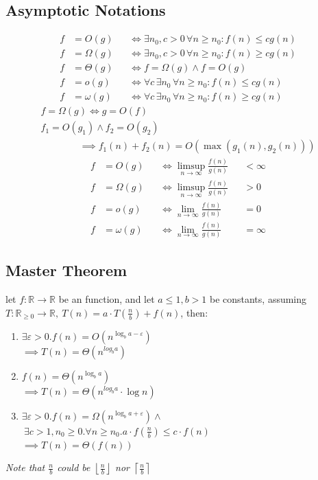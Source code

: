 \documentclass[]{article}
\newcommand\compactsubsection[1]        {\vspace{-10pt}\subsection{#1}\vspace{-5pt}}
\theoremstyle{definition}
\newcommand\R     {\mathbb{R}}
\newcommand\vepsi {\varepsilon}
\newcommand\rc    {\right\rceil}
\newcommand\lc    {\left\lceil}
\newcommand\rf    {\right\rfloor}
\newcommand\lf    {\left\lfloor}
\renewcommand\inf {\infty}
\newcommand\co        {\colon}
\newcommand\logn      {\log n}
\newcommand\dequad    {\!\!\!\!\!\!}
\begin{document}
\begin{multicols}{4}
			\vspace{-1pt}
			\compactsubsection{Asymptotic Notations}
				\vspace{6pt}
				\begin{alignat*}{9}
					f &= O(g) &&\iff \exists n_0, c > 0\, \forall n \ge n_0\co f(n) \le c g(n) \\
					f &= \Omega(g) &&\iff \exists n_0, c > 0\, \forall n \ge n_0\co f(n) \ge c g(n) \\
					f &= \Theta(g) &&\iff f = \Omega(g) \land f = O(g) \\
					f &= o(g) &&\iff \forall c\, \exists n_0\, \forall n \ge n_0\co f(n) \le cg(n) \\
					f &= \omega(g) &&\iff \forall c\, \exists n_0\, \forall n \ge n_0\co f(n) \ge cg(n)
				\end{alignat*}
				\vspace{-3pt}
				\begin{gather*}
					f = \Omega(g) \iff g = O(f) \\
					\dequad f_1 = O(g_1) \land f_2 = O(g_2)\quad\quad\quad\quad  \\ \quad\quad\quad\quad  \implies f_1(n) + f_2(n) = O(\max(g_1(n), g_2(n)))
				\end{gather*}
				\vspace{-5pt}
				\begin{alignat*}{9}
					f &= O(g)      &&\iff \limsup_{n \to \inf} \textstyle \frac{f(n)}{g(n)} &&< \inf \\
					f &= \Omega(g) &&\iff \limsup_{n \to \inf} \textstyle \frac{f(n)}{g(n)} &&> 0 \\
					f &= o(g)      &&\iff \lim_{n \to \inf}    \textstyle \frac{f(n)}{g(n)} &&= 0 \\
					f &= \omega(g) &&\iff \lim_{n \to \inf}    \textstyle \frac{f(n)}{g(n)} &&= \inf
				\end{alignat*}
			
			\compactsubsection{Master Theorem}
				let $ f \colon \R \to \R $ be an function, and let $ a \le 1, b >1 $ be constants, assuming $ T \colon \R_{\ge 0} \to \R, \ T(n) = a \cdot T\left (\tfrac{n}{b} \right ) + f(n)$, then: 
				\begin{enumerate}
					\item $ \exists \vepsi > 0. f(n) = O(n^{\log_b a - \vepsi}) $ \\ $\implies T(n) = \Theta(n^{log_b a}) $
					\item $ f(n) = \Theta(n^{\log_b a}) $ \\ $\implies T(n) = \Theta(n^{log_b a} \cdot \logn) $
					\item $ \exists \vepsi > 0. f(n) = \Omega(n^{\log_b a + \vepsi}) \land $ \\
					$\ \exists c>1, n_0 \ge 0. \forall n \ge n_0. a \cdot f(\tfrac{n}{b}) \le c \cdot f(n) $ \\
					$\implies T(n) = \Theta(f(n)) $
				\end{enumerate}
				\textit{Note that $ \mathit{\tfrac{n}{b}} $ could be $ \mathit{\lf \tfrac{n}{b} \rf} $ nor $ \mathit{\lc \tfrac{n}{b} \rc} $}
				

\end{multicols}
\end{document}
